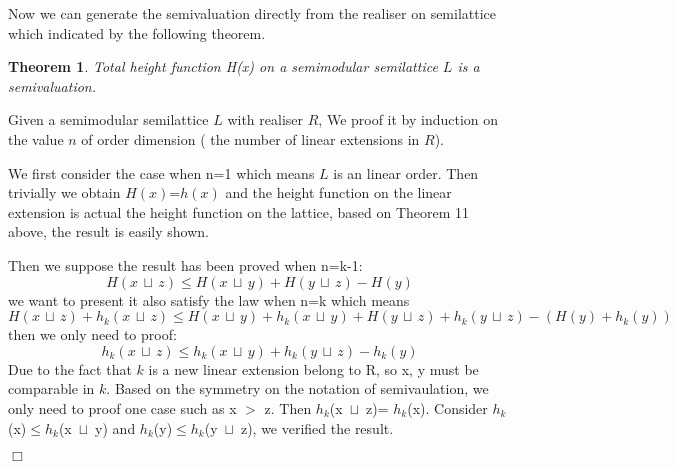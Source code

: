 \documentclass{article}
\newenvironment{proof}{\par \noindent {\bf Proof:}}{\begin{flushright}$\Box$\end{flushright}\par \noindent}
\newtheorem{theorem}{\bf Theorem}
\begin{document}
Now we can generate the semivaluation directly from the realiser on semilattice which indicated by the following theorem.

\begin{theorem}
Total height function H(x) on a semimodular semilattice $L$ is a semivaluation.
\end{theorem}

\begin{proof}

Given a semimodular semilattice $L$ with realiser $R$, We proof it by induction on the value $n$ of order dimension ( the number of linear extensions in $R$). 

We first consider the case when n=1 which means $L$ is an linear order. Then trivially we obtain $H(x)$=$h(x)$ and the height function on the linear extension is actual the height function on the lattice, based on Theorem 11 above, the result is easily shown. 

Then we suppose the result has been proved when n=k-1: $$ H(x \, \sqcup \,  z) \leq H(x \, \sqcup \,  y) + H(y \, \sqcup \, 
 z) -H(y) $$ we want to present it also satisfy the law when n=k which means $$ H(x \, \sqcup \,  z)+h_{k}(x \, \sqcup \,  z) \leq H(x \, \sqcup \,  y) +h_{k}(x \, \sqcup \,  y) + H(y \, \sqcup \, z)+h_{k}(y \, \sqcup \,  z)  -(H(y)+h_{k}(y) ) $$ then we only need to proof: $$ h_{k}(x \, \sqcup \,  z) \leq h_{k}(x \, \sqcup \,  y) + h_{k}(y \, \sqcup \,  z)  - h_{k}(y)  $$ Due to the fact that $k$ is a new linear extension belong to R, so x, y must be comparable in $k$. Based on the symmetry on the notation of semivaulation, we only need to proof one case such as x $>$ z. Then $h_{k}$(x\, $\sqcup$\,  z)= $h_{k}$(x). Consider $h_{k}$(x)$\leq$$h_{k}$(x\, $\sqcup$\,  y) and $h_{k}$(y)$\leq$$h_{k}$(y\, $\sqcup$\,  z), we verified the result.

\end{proof}
\end{document}
